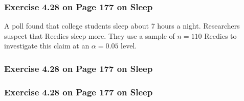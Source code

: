\documentclass[handout]{beamer}
\newcommand{\blue}[1]{\textcolor{blue2}{#1}}
\newcommand{\xbar}{\overline{x}}
\begin{document}
\begin{frame}
\frametitle{Exercise 4.28 on Page 177 on Sleep}
A poll found that college students sleep about 7 hours a night.  Researchers suspect that Reedies sleep more.  They use a sample of $n=110$ Reedies to investigate this claim at an $\alpha=0.05$ level.  

\vspace{0.5cm}

%

\end{frame}


\begin{frame}
\frametitle{Exercise 4.28 on Page 177 on Sleep}


\end{frame}


\begin{frame}
\frametitle{Exercise 4.28 on Page 177 on Sleep}

%
%
%
%

\end{frame}
\end{document}
